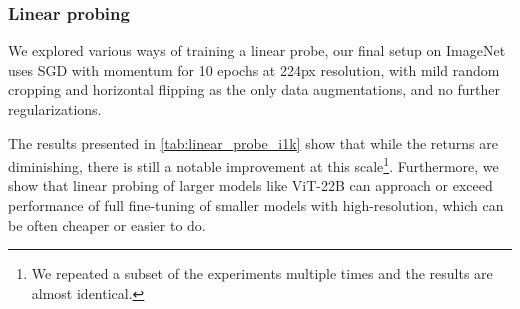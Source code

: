 \documentclass{article}
\newcommand{\chonk}{\mbox{ViT-22B}\xspace}
\begin{document}
\subsubsection{Linear probing}

We explored various ways of training a linear probe, 
our final setup on ImageNet uses SGD with momentum for 10 epochs at 224px resolution, with mild random cropping and horizontal flipping as the only data augmentations, and no further regularizations.

The results presented in \cref{tab:linear_probe_i1k} show that while the returns are diminishing, there is still a notable improvement at this scale\footnote{We repeated a subset of the experiments multiple times and the results are almost identical.}.
Furthermore, we show that linear probing of larger models like \chonk can approach or exceed performance of full fine-tuning of smaller models with high-resolution, which can be often cheaper or easier to do.
\end{document}
